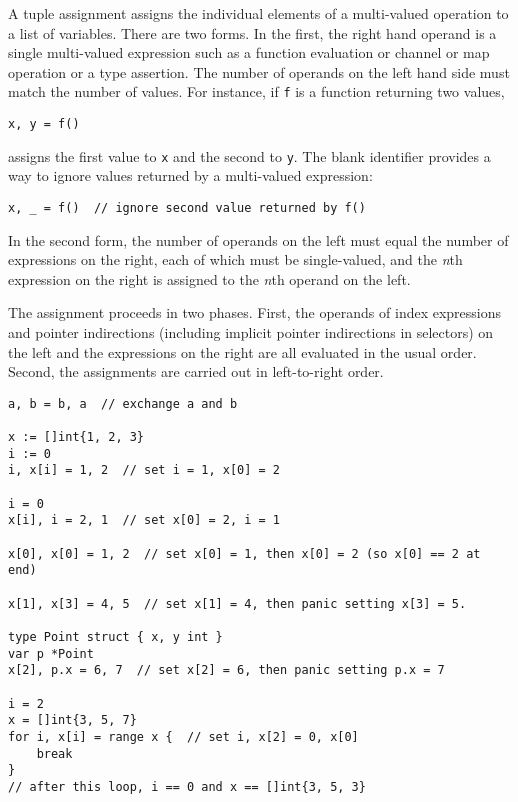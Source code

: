 A tuple assignment assigns the individual elements of a multi-valued
operation to a list of variables. There are two forms. In the first, the
right hand operand is a single multi-valued expression such as a
function evaluation or channel or
map operation or a
type assertion. The number of operands on
the left hand side must match the number of values. For instance, if
\texttt{f} is a function returning two values,

\begin{Verbatim}[frame=single]
x, y = f()
\end{Verbatim}

assigns the first value to \texttt{x} and the second to \texttt{y}. The
blank identifier provides a way to ignore
values returned by a multi-valued expression:

\begin{Verbatim}[frame=single]
x, _ = f()  // ignore second value returned by f()
\end{Verbatim}

In the second form, the number of operands on the left must equal the
number of expressions on the right, each of which must be single-valued,
and the \emph{n}th expression on the right is assigned to the \emph{n}th
operand on the left.

The assignment proceeds in two phases. First, the operands of
index expressions and
pointer indirections (including implicit
pointer indirections in selectors) on the left and
the expressions on the right are all
evaluated in the usual order. Second,
the assignments are carried out in left-to-right order.

\begin{Verbatim}[frame=single]
a, b = b, a  // exchange a and b

x := []int{1, 2, 3}
i := 0
i, x[i] = 1, 2  // set i = 1, x[0] = 2

i = 0
x[i], i = 2, 1  // set x[0] = 2, i = 1

x[0], x[0] = 1, 2  // set x[0] = 1, then x[0] = 2 (so x[0] == 2 at end)

x[1], x[3] = 4, 5  // set x[1] = 4, then panic setting x[3] = 5.

type Point struct { x, y int }
var p *Point
x[2], p.x = 6, 7  // set x[2] = 6, then panic setting p.x = 7

i = 2
x = []int{3, 5, 7}
for i, x[i] = range x {  // set i, x[2] = 0, x[0]
    break
}
// after this loop, i == 0 and x == []int{3, 5, 3}
\end{Verbatim}

